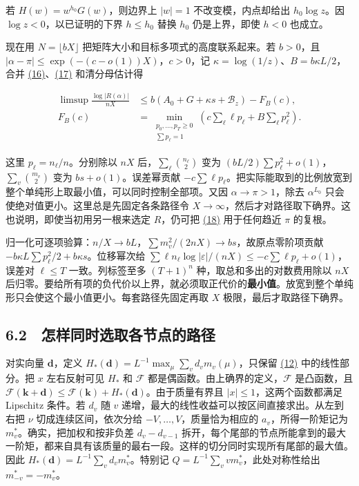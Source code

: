 \documentclass[11pt,a4paper]{article}
\begin{document}
若 \(H(w)=w^{h_0}G(w)\)，则边界上 \(|w|=1\) 不改变模，内点却给出 \(h_0\log z\)。因 \(\log z<0\)，以已证明的下界 \(h\le h_0\) 替换 \(h_0\) 仍是上界，即使 \(h<0\) 也成立。

现在用 \(N=\lfloor bX\rfloor\) 把矩阵大小和目标多项式的高度联系起来。若 \(b>0\)，且 \(|\alpha-\pi|\le\exp(-(c-o(1))X)\)，\(c>0\)，记 \(\kappa=\log(1/z)\)、\(B=b\kappa L/2\)，合并 \hyperref[eq:16]{(16)}、\hyperref[eq:17]{(17)} 和清分母估计得

\[
 \begin{aligned}
 \limsup\frac{\log|R(\alpha)|}{nX}
 &\le b(A_0+G+\kappa s+\mathcal B_z)-F_B(c),\\
 F_B(c)&=\min_{\substack{p_0,\ldots,p_T\ge0\\ \sum p_\ell=1}}
        \left(c\sum_\ell \ell p_\ell+B\sum_\ell p_\ell^2\right).
 \end{aligned}                                                            \tag{18}\label{eq:18}
\]

这里 \(p_\ell=n_\ell/n\)。分别除以 \(nX\) 后，\(\sum_\ell\binom{n_\ell}{2}\) 变为 \((bL/2)\sum p_\ell^2+o(1)\)，\(\sum_v\binom{m_v}{2}\) 变为 \(bs+o(1)\)。误差幂贡献 \(-c\sum\ell p_\ell\)。把实际能取到的比例放宽到整个单纯形上取最小值，可以同时控制全部项。又因 \(\alpha\to\pi>1\)，除去 \(\alpha^{L_0}\) 只会使绝对值更小。这里总是先固定各条路径令 \(X\to\infty\)，然后才对路径取下确界。这也说明，即使当初用另一根来选定 \(R\)，仍可把 \hyperref[eq:18]{(18)} 用于任何趋近 \(\pi\) 的复根。

归一化可逐项验算：\(n/X\to bL\)，\(\sum m_v^2/(2nX)\to bs\)，故原点零阶项贡献 \(-b\kappa L\sum p_\ell^2/2+b\kappa s\)。位移幂次给 \(\sum\ell n_\ell\log|\varepsilon|/(nX)\le-c\sum\ell p_\ell+o(1)\)，误差对 \(\ell\le T\) 一致。列标签至多 \((T+1)^n\) 种，取总和多出的对数费用除以 \(nX\) 后归零。要给所有项的负代价以上界，就必须取正代价的\textbf{最小值}。放宽到整个单纯形只会使这个最小值更小。每套路径先固定再取 \(X\) 极限，最后才取路径下确界。

\subsection{6.2　怎样同时选取各节点的路径}\label{ux600eux6837ux540cux65f6ux9009ux53d6ux5404ux8282ux70b9ux7684ux8defux5f84}

对实向量 \(\mathbf d\)，定义 \(H_*(\mathbf d)=L^{-1}\max_\mu\sum_vd_vm_v(\mu)\)，只保留 \hyperref[eq:12]{(12)} 中的线性部分。把 \(x\) 左右反射可见 \(H_*\) 和 \(\mathcal F\) 都是偶函数。由上确界的定义，\(\mathcal F\) 是凸函数，且 \(\mathcal F(\mathbf k+\mathbf d)\le\mathcal F(\mathbf k)+H_*(\mathbf d)\)。由于质量有界且 \(|x|\le1\)，这两个函数都满足 Lipschitz 条件。若 \(d_v\) 随 \(v\) 递增，最大的线性收益可以按区间直接求出。从左到右把 \(\nu\) 切成连续区间，依次分给 \(-V,\ldots,V\)，质量恰为相应的 \(a_v\)，所得一阶矩记为 \(m_v^*\)。确实，把加权和按非负差 \(d_v-d_{v-1}\) 拆开，每个尾部的节点所能拿到的最大一阶矩，都来自具有该质量的最右一段。这样的切分同时实现所有尾部的最大值。因此 \(H_*(\mathbf d)=L^{-1}\sum_vd_vm_v^*\)。特别记 \(Q=L^{-1}\sum_vv m_v^*\)，此处对称性给出 \(m_{-v}^*=-m_v^*\)。
\end{document}
